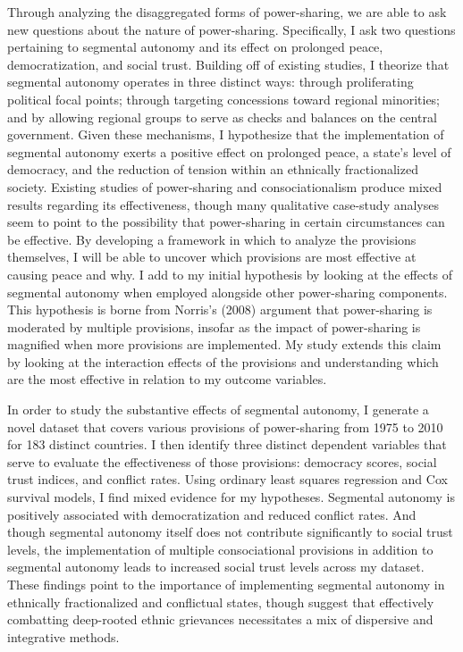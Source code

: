 \documentclass[12pt]{article}
\begin{document}
Through analyzing the disaggregated forms of power-sharing, we are able to ask new questions about the nature of power-sharing. Specifically, I ask two questions pertaining to segmental autonomy and its effect on prolonged peace, democratization, and social trust. Building off of existing studies, I theorize that segmental autonomy operates in three distinct ways: through proliferating political focal points; through targeting concessions toward regional minorities; and by allowing regional groups to serve as checks and balances on the central government. Given these mechanisms, I hypothesize that the implementation of segmental autonomy exerts a positive effect on prolonged peace, a state’s level of democracy, and the reduction of tension within an ethnically fractionalized society. Existing studies of power-sharing and consociationalism produce mixed results regarding its effectiveness, though many qualitative case-study analyses seem to point to the possibility that power-sharing in certain circumstances can be effective. By developing a framework in which to analyze the provisions themselves, I will be able to uncover which provisions are most effective at causing peace and why. I add to my initial hypothesis by looking at the effects of segmental autonomy when employed alongside other power-sharing components. This hypothesis is borne from Norris’s (2008) argument that power-sharing is moderated by multiple provisions, insofar as the impact of power-sharing is magnified when more provisions are implemented. My study extends this claim by looking at the interaction effects of the provisions and understanding which are the most effective in relation to my outcome variables.

In order to study the substantive effects of segmental autonomy, I generate a novel dataset that covers various provisions of power-sharing from 1975 to 2010 for 183 distinct countries. I then identify three distinct dependent variables that serve to evaluate the effectiveness of those provisions: democracy scores, social trust indices, and conflict rates. Using ordinary least squares regression and Cox survival models, I find mixed evidence for my hypotheses. Segmental autonomy is positively associated with democratization and reduced conflict rates. And though segmental autonomy itself does not contribute significantly to social trust levels, the implementation of multiple consociational provisions in addition to segmental autonomy leads to increased social trust levels across my dataset. These findings point to the importance of implementing segmental autonomy in ethnically fractionalized and conflictual states, though suggest that effectively combatting deep-rooted ethnic grievances necessitates a mix of dispersive and integrative methods.
 
\end{document}
